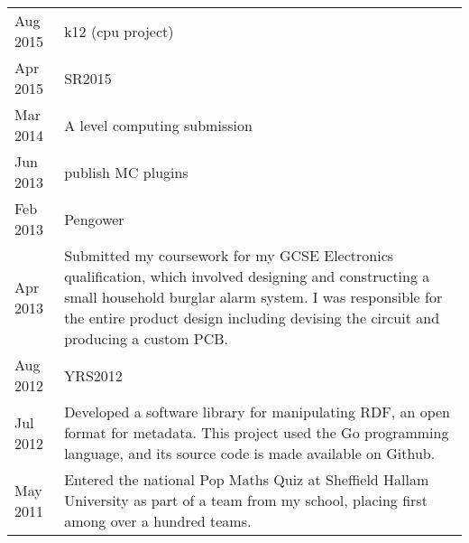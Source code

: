 

{
\setlength{\extrarowheight}{.7em}
\begin{tabu} to \textwidth {X[1,l] X[8,l]}
    Aug 2015 & k12 (cpu project) \\
    Apr 2015 & SR2015 \\
    Mar 2014 & A level computing submission \\
    Jun 2013 & publish MC plugins \\
    Feb 2013 & Pengower \\
    Apr 2013 & Submitted my coursework for my GCSE Electronics qualification, which involved designing and constructing a small household burglar alarm system. I was responsible for the entire product design including devising the circuit and producing a custom PCB. \\
    Aug 2012 & YRS2012 \\
    Jul 2012 & Developed a software library for manipulating RDF, an open format for metadata. This project used the Go programming language, and its source code is made available on Github. \\
    May 2011 & Entered the national Pop Maths Quiz at Sheffield Hallam University as part of a team from my school, placing first among over a hundred teams. \\
\end{tabu}
}

